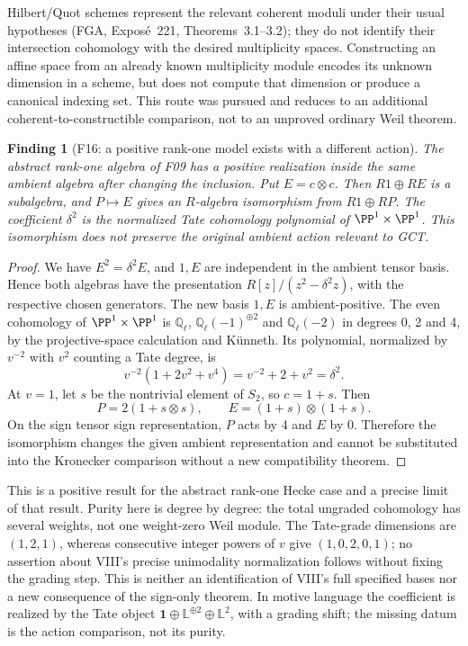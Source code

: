 \documentclass[11pt,a4paper]{article}
\newcommand{\Q}{\mathbb Q}\newcommand{\Z}{\mathbb Z}\newcommand{\C}{\mathbb C}\newcommand{\N}{\mathbb N}\newcommand{\F}{\mathbb F}
\newcommand{\fid}[1]{\textsf{#1}}\newcommand{\gate}[1]{\textsf{#1}}
\theoremstyle{named}\newtheorem{finding}{Finding}[section]
\theoremstyle{definition}\newtheorem{definition}[finding]{Definition}
\theoremstyle{remark}\newtheorem{remark}[finding]{Remark}
\begin{document}
Hilbert/Quot schemes represent the relevant coherent moduli under their usual hypotheses (FGA, Expos\'e~221, Theorems~3.1--3.2); they do not identify their intersection cohomology with the desired multiplicity spaces. Constructing an affine space from an already known multiplicity module encodes its unknown dimension in a scheme, but does not compute that dimension or produce a canonical indexing set. This route was pursued and reduces to an additional coherent-to-constructible comparison, not to an unproved ordinary Weil theorem.

\begin{finding}[\fid{F16}: a positive rank-one model exists with a different action]\label{f:rankonemodel}
The abstract rank-one algebra of \fid{F09} has a positive realization inside the same ambient algebra after changing the inclusion. Put $E=c\otimes c$. Then $R1\oplus RE$ is a subalgebra, and $P\mapsto E$ gives an $R$-algebra isomorphism from $R1\oplus RP$. The coefficient $\delta^2$ is the normalized Tate cohomology polynomial of $\PP^1\times\PP^1$. This isomorphism does not preserve the original ambient action relevant to GCT.
\end{finding}
\begin{proof}
We have $E^2=\delta^2E$, and $1,E$ are independent in the ambient tensor basis. Hence both algebras have the presentation $R[z]/(z^2-\delta^2z)$, with the respective chosen generators. The new basis $1,E$ is ambient-positive. The even cohomology of $\PP^1\times\PP^1$ is $\Q_\ell$, $\Q_\ell(-1)^{\oplus2}$ and $\Q_\ell(-2)$ in degrees 0, 2 and 4, by the projective-space calculation and K\"unneth. Its polynomial, normalized by $v^{-2}$ with $v^2$ counting a Tate degree, is
\[
 v^{-2}(1+2v^2+v^4)=v^{-2}+2+v^2=\delta^2.
\]
At $v=1$, let $s$ be the nontrivial element of $S_2$, so $c=1+s$. Then
\[
 P=2(1+s\otimes s),\qquad E=(1+s)\otimes(1+s).
\]
On the sign tensor sign representation, $P$ acts by 4 and $E$ by 0. Therefore the isomorphism changes the given ambient representation and cannot be substituted into the Kronecker comparison without a new compatibility theorem.
\end{proof}
This is a positive result for the abstract rank-one Hecke case and a precise limit of that result. Purity here is degree by degree: the total ungraded cohomology has several weights, not one weight-zero Weil module. The Tate-grade dimensions are $(1,2,1)$, whereas consecutive integer powers of $v$ give $(1,0,2,0,1)$; no assertion about VIII's precise unimodality normalization follows without fixing the grading step. This is neither an identification of VIII's full specified bases nor a new consequence of the sign-only theorem. In motive language the coefficient is realized by the Tate object $\mathbf1\oplus\mathbb L^{\oplus2}\oplus\mathbb L^2$, with a grading shift; the missing datum is the action comparison, not its purity.
\end{document}
